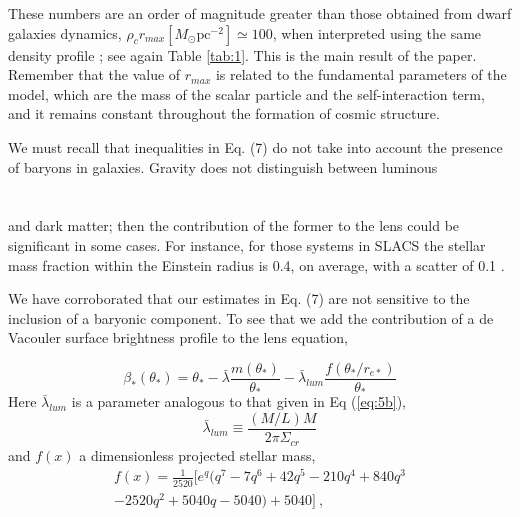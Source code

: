 \documentclass[10pt,twoside,twocolumn]{article}
\begin{document}
These numbers are an order of magnitude greater than those obtained from dwarf galaxies dynamics, $\rho_cr_{max}[M_{\odot}\text{pc}^{-2}]\simeq100$, when interpreted using the same density profile \cite{7}; see again Table \ref{tab:1}. This is the main result of the paper. Remember that the value of $r_{max}$ is related to the fundamental parameters of the model, which
are the mass of the scalar particle and the self-interaction term, and it remains constant throughout the formation of cosmic structure.\par
We must recall that inequalities in Eq. (7) do not take into account the presence of baryons in galaxies. Gravity does not distinguish between luminous \\ \\ \\
and dark matter; then the contribution of the former to the lens could be significant in some cases. For instance, for those systems in SLACS the stellar mass fraction within the Einstein radius is 0.4, on average, with a scatter of 0.1 \cite{21}. \par
We have corroborated that our estimates in Eq. (7) are not sensitive to the inclusion of a baryonic component. To see that we add the contribution of a de Vacouler surface brightness profile \cite{22} to the lens equation,

        \begin{equation} \tag{8a}
                 \beta_*(\theta_*)=\theta_*-{\bar{\lambda}}\frac{m(\theta_*)}{\theta_*}-{\bar{\lambda}}_{lum}\frac{f(\theta_*/r_{e*})}{\theta_*}
                 \label{eq:8a}        
        \end{equation}
Here ${\bar{\lambda}}_{lum}$ is a parameter analogous to that given in Eq (\ref{eq:5b}),
        \begin{equation} \tag{8b}
                 {\bar{\lambda}}_{lum}\equiv\frac{(M/L)M}{2\pi\Sigma_{cr}}
                 \label{eq:8b}        
        \end{equation}
and $f(x)$ a dimensionless projected stellar mass,
         \begin{equation} \tag{8c}
         \begin{split}
                 f(x)=\frac{1}{2520}[e^q(q^7-7q^6+42q^5-210q^4+840q^3\\
                 -2520q^2+5040q-5040)+5040]~,
                 \label{eq:8c}     
         \end{split}
        \end{equation}
\end{document}
